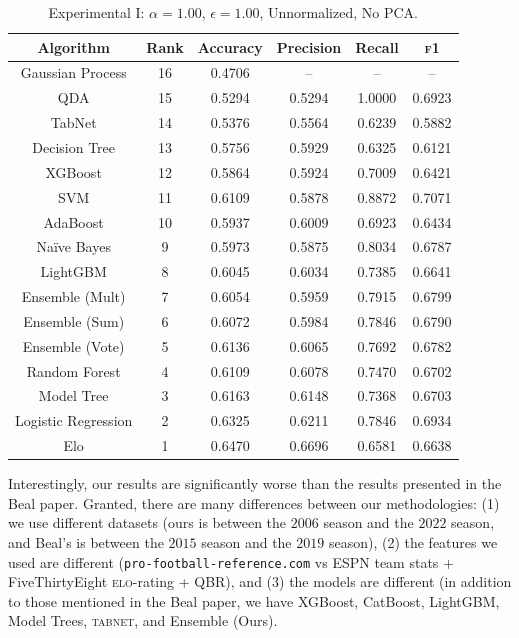 \documentclass[10pt]{article}
\begin{document}
\begin{table}[htbp]
\centering
\begin{tabular}{|c|c|c|c|c|c|}
\hline
Algorithm & Rank & Accuracy & Precision & Recall & \textsc{f1} \\ \hline
Gaussian Process & 16 & 0.4706 & -- & -- & -- \\
QDA & 15 & 0.5294 & 0.5294 & 1.0000 & 0.6923 \\
TabNet & 14 & 0.5376 & 0.5564 & 0.6239 & 0.5882 \\
Decision Tree & 13 & 0.5756 & 0.5929 & 0.6325 & 0.6121 \\
XGBoost & 12 & 0.5864 & 0.5924 & 0.7009 & 0.6421 \\
SVM & 11 & 0.6109 & 0.5878 & 0.8872 & 0.7071 \\
AdaBoost & 10 & 0.5937 & 0.6009 & 0.6923 & 0.6434 \\
Na\"ive Bayes & 9 & 0.5973 & 0.5875 & 0.8034 & 0.6787 \\
LightGBM & 8 & 0.6045 & 0.6034 & 0.7385 & 0.6641 \\
Ensemble (Mult) & 7 & 0.6054 & 0.5959 & 0.7915 & 0.6799 \\
Ensemble (Sum) & 6 & 0.6072 & 0.5984 & 0.7846 & 0.6790 \\
Ensemble (Vote) & 5 & 0.6136 & 0.6065 & 0.7692 & 0.6782 \\
Random Forest & 4 & 0.6109 & 0.6078 & 0.7470 & 0.6702 \\
Model Tree & 3 & 0.6163 & 0.6148 & 0.7368 & 0.6703 \\ \hline
Logistic Regression & 2 & 0.6325 & 0.6211 & 0.7846 & 0.6934 \\ \hline
Elo & 1 & 0.6470 & 0.6696 & 0.6581 & 0.6638 \\
\hline
\end{tabular}
\caption{Experimental I: $\alpha=1.00$, $\epsilon = 1.00$, Unnormalized, No PCA.}
\label{table:experiment-I}
\end{table}

Interestingly, our results are significantly worse than the results presented in the
 Beal paper. Granted, there are many differences between our methodologies: (1) we use
different datasets (ours is between the $2006$ season and the $2022$ season,
and Beal's is between the $2015$ season and the $2019$ season), (2) the features
we used are different (\texttt{pro-football-reference.com} vs
ESPN team stats + FiveThirtyEight \textsc{elo}-rating + QBR),
and (3) the models are different (in addition to
those mentioned in the Beal paper, we have XGBoost, CatBoost, LightGBM, Model Trees,
\textsc{tabnet}, and Ensemble (Ours).
\end{document}
